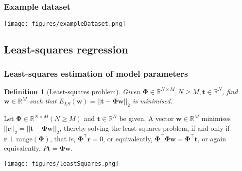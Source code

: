 \documentclass{beamer}
\newtheorem{probDef}{Definition}
\begin{document}
\begin{frame}
    \frametitle{Example dataset}

    \begin{center}
        \texttt{[image: figures/exampleDataset.png]}
    \end{center}
    \hfill\scriptsize\citet{bishop06}

\end{frame}

\subsection{Least-squares regression}

\begin{frame}
    \frametitle{Least-squares estimation of model parameters
    \citep{trefethenAndBau97}}

    \scriptsize
    \begin{probDef}[Least-squares problem]
        Given $\boldsymbol{\Phi}\in\mathbb{R}^{N\times M},N\ge
        M,\mathbf{t}\in\mathbb{R}^N$, find $\mathbf{w}\in\mathbb{R}^M$ such
        that $E_{LS}(\mathbf{w})=||\mathbf{t}-\boldsymbol{\Phi}\boldsymbol{w}||_2$ is minimised.
    \end{probDef}
    \begin{theorem}
        Let $\boldsymbol{\Phi}\in\mathbb{R}^{N\times M} (N\ge M)$ and
        $\mathbf{t}\in\mathbb{R}^N$ be given. A vector
        $\mathbf{w}\in\mathbb{R}^M$ minimises
        $||\mathbf{r}||_2=||\mathbf{t}-\boldsymbol{\Phi}\mathbf{w}||_2$, thereby solving the
        least-squares problem, if and only if
        $\mathbf{r}\perp\text{range}(\boldsymbol{\Phi})$, that is,
        $\boldsymbol{\Phi}^\intercal\mathbf{r}=0$,
        or equivalently,
        $\boldsymbol{\Phi}^\intercal\boldsymbol{\Phi}\mathbf{w}=\boldsymbol\Phi^\intercal\mathbf{t}$,
        or again equivalently,
        $P\mathbf{t}=\boldsymbol{\Phi}\mathbf{w}$.
    \end{theorem}
	\begin{center}
		\texttt{[image: figures/leastSquares.png]}
	\end{center}
    \hfill\scriptsize\citet{bishop06}
    \normalsize

\end{frame}
\end{document}
